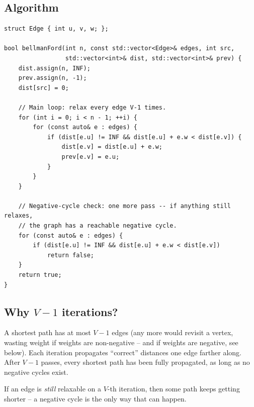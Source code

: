 \documentclass[11pt]{article}
\begin{document}
\subsection*{Algorithm}

\begin{lstlisting}[basicstyle=\ttfamily\small,frame=single]
struct Edge { int u, v, w; };

bool bellmanFord(int n, const std::vector<Edge>& edges, int src,
                 std::vector<int>& dist, std::vector<int>& prev) {
    dist.assign(n, INF);
    prev.assign(n, -1);
    dist[src] = 0;

    // Main loop: relax every edge V-1 times.
    for (int i = 0; i < n - 1; ++i) {
        for (const auto& e : edges) {
            if (dist[e.u] != INF && dist[e.u] + e.w < dist[e.v]) {
                dist[e.v] = dist[e.u] + e.w;
                prev[e.v] = e.u;
            }
        }
    }

    // Negative-cycle check: one more pass -- if anything still relaxes,
    // the graph has a reachable negative cycle.
    for (const auto& e : edges) {
        if (dist[e.u] != INF && dist[e.u] + e.w < dist[e.v])
            return false;
    }
    return true;
}
\end{lstlisting}

\subsection*{Why $V-1$ iterations?}

A shortest path has at most $V-1$ edges (any more would revisit a vertex, wasting weight if weights are non-negative -- and if weights are negative, see below). Each iteration propagates ``correct'' distances one edge farther along. After $V-1$ passes, every shortest path has been fully propagated, as long as no negative cycles exist.

If an edge is \emph{still} relaxable on a $V$-th iteration, then some path keeps getting shorter -- a negative cycle is the only way that can happen.
\end{document}

